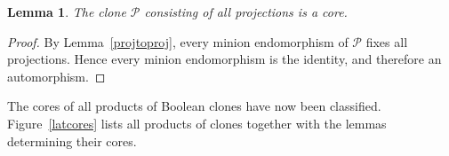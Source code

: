 \documentclass{amsart}
\numberwithin{equation}{section}
\theoremstyle{plain}
\newtheorem{lemma}[theorem]{Lemma}
\theoremstyle{definition}
\def\clone#1{\mathcal{#1}}
\begin{document}
\begin{lemma}\label{proj} The clone $\clone{P}$ consisting of all projections is a core.
\end{lemma}
\begin{proof}
By Lemma~\ref{projtoproj}, every minion endomorphism of $\clone{P}$ fixes all projections. Hence every minion endomorphism is the identity, and therefore an automorphism.
\end{proof}


The cores of all products of Boolean clones have now been classified. Figure~\ref{latcores} lists all products of clones together with the lemmas determining their cores.

\begin{figure}
\end{figure}
\end{document}
